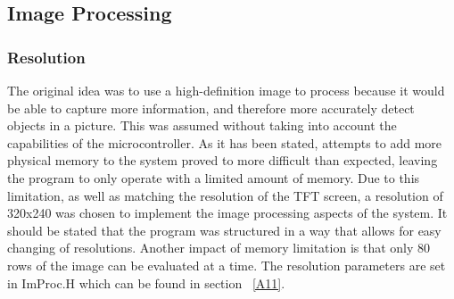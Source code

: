 \subsection{Image Processing}
\subsubsection{Resolution}
The original idea was to use a high-definition image to process because it would be able to capture more information, and therefore more accurately detect objects in a picture. This was assumed without taking into account the capabilities of the microcontroller. As it has been stated, attempts to add more physical memory to the system proved to more difficult than expected, leaving the program to only operate with a limited amount of memory. Due to this limitation, as well as matching the resolution of the TFT screen, a resolution of 320x240 was chosen to implement the image processing aspects of the system. It should be stated that the program was structured in a way that allows for easy changing of resolutions. Another impact of memory limitation is that only 80 rows of the image can be evaluated at a time. The resolution parameters are set in ImProc.H which can be found in section ~\ref{A11}.\\

